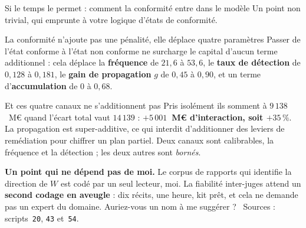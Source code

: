 \documentclass[11pt]{beamer}
\begin{document}
\begin{frame}{Si le temps le permet : comment la conformité entre dans le modèle}
\scriptsize
Un point non trivial, qui emprunte à votre logique d'états de conformité.
\vspace{1.5mm}
\begin{block}{La conformité n'ajoute pas une pénalité, elle déplace quatre paramètres}
Passer de l'état conforme à l'état non conforme ne surcharge le capital d'aucun terme
additionnel : cela déplace la \textbf{fréquence} de $21{,}6$ à $53{,}6$, le \textbf{taux de
détection} de $0{,}128$ à $0{,}181$, le \textbf{gain de propagation} $g$ de $0{,}45$ à $0{,}90$,
et un terme d'\textbf{accumulation} de $0$ à $0{,}68$.
\end{block}
\vspace{-1mm}
\begin{block}{Et ces quatre canaux ne s'additionnent pas}
Pris isolément ils somment à $9\,138$~M\euro{} quand l'écart total vaut $14\,139$ :
\textbf{$+5\,001$~M\euro{} d'interaction, soit $+35\,\%$}. La propagation est super-additive, ce
qui interdit d'additionner des leviers de remédiation pour chiffrer un plan partiel. Deux canaux
sont calibrables, la fréquence et la détection ; les deux autres sont \emph{bornés}.
\end{block}
\vspace{-1mm}
{\scriptsize \textbf{Un point qui ne dépend pas de moi.} Le corpus de rapports qui identifie la
direction de $W$ est codé par un seul lecteur, moi. La fiabilité inter-juges attend un
\textbf{second codage en aveugle} : dix récits, une heure, kit prêt, et cela ne demande pas un
expert du domaine. Auriez-vous un nom à me suggérer ?
\ Sources : scripts~\texttt{20}, \texttt{43} et~\texttt{54}.}
\end{frame}
\end{document}
